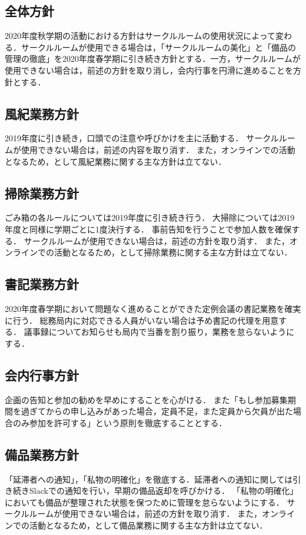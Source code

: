 \subsection*{全体方針}
2020年度秋学期の活動における方針はサークルルームの使用状況によって変わる．サークルルームが使用できる場合は，「サークルルームの美化」と「備品の管理の徹底」を2020年度春学期に引き続き方針とする．一方，サークルルームが使用できない場合は，前述の方針を取り消し，会内行事を円滑に進めることを方針とする．

\subsection*{風紀業務方針}
2019年度に引き続き，口頭での注意や呼びかけを主に活動する．
サークルルームが使用できない場合は，前述の内容を取り消す．
また，オンラインでの活動となるため，\soumuDepartment{}として風紀業務に関する主な方針は立てない．

\subsection*{掃除業務方針}
ごみ箱の各ルールについては2019年度に引き続き行う．
大掃除については2019年度と同様に学期ごとに1度決行する．
事前告知を行うことで参加人数を確保する．
サークルルームが使用できない場合は，前述の方針を取り消す．
また，オンラインでの活動となるため，\soumuDepartment{}として掃除業務に関する主な方針は立てない．

\subsection*{書記業務方針}
2020年度春学期において問題なく進めることができた定例会議の書記業務を確実に行う．
総務局内に対応できる人員がいない場合は予め書記の代理を用意する．
議事録についてお知らせも局内で当番を割り振り，業務を怠らないようにする．

\subsection*{会内行事方針}
企画の告知と参加の勧めを早めにすることを心がける．
また「もし参加募集期間を過ぎてからの申し込みがあった場合，定員不足，また定員から欠員が出た場合のみ参加を許可する」という原則を徹底することとする．

\subsection*{備品業務方針}
「延滞者への通知」，「私物の明確化」を徹底する．延滞者への通知に関しては引き続きSlackでの通知を行い，早期の備品返却を呼びかける．
「私物の明確化」においても備品が整理された状態を保つために管理を怠らないようにする．
サークルルームが使用できない場合は，前述の方針を取り消す．
また，オンラインでの活動となるため，\soumuDepartment{}として備品業務に関する主な方針は立てない．

